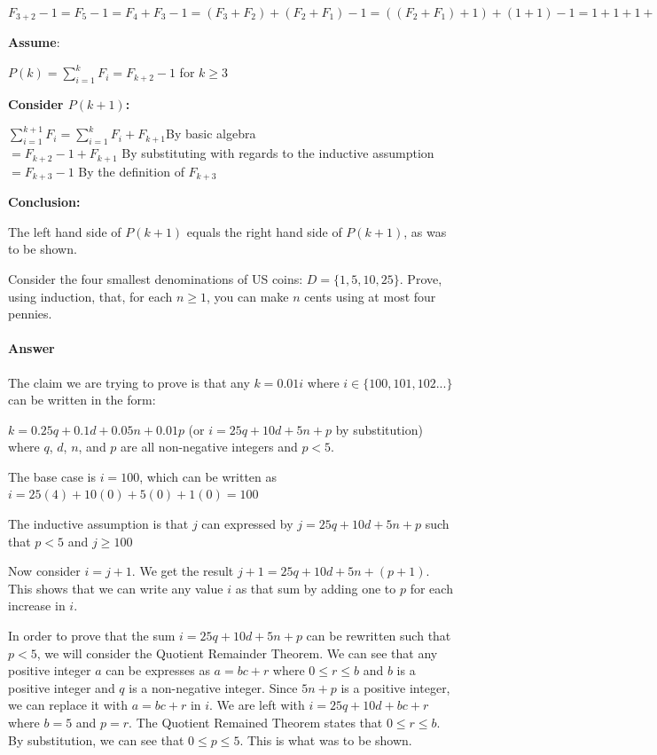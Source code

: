 \documentclass{article}
\begin{document}
$F_{3+2}-1 = F_5 - 1 = F_4 + F_3 - 1 = (F_3 + F_2) +(F_2 + F_1) - 1 = ((F_2 + F_1) + 1) + (1 + 1) - 1 =1 + 1 + 1 + 1 + 1 -1 = 4$

\textbf{Assume}:

$P(k) = \sum_{i=1}^k F_i = F_{k+2}-1$ for $k \geq 3$ 

\textbf{Consider $P(k+1)$:}

$\sum_{i=1}^{k+1} F_i = \sum_{i=1}^k F_i + F_{k+1}$\quad By basic algebra \\
$= F_{k+2}-1 + F_{k+1}$ \quad By substituting with regards to the inductive assumption \\
$= F_{k+3} - 1$ \quad By the definition of $F_{k+3}$

\textbf{Conclusion:}

The left hand side of $P(k+1)$ equals the right hand side of $P(k+1)$, as was to be shown.



 

Consider the four smallest denominations of US coins: $D=\{1,5,10,25\}$.  Prove, using
induction, that, for each $n \geq 1$, you can make $n$ cents using at most four
pennies.

\paragraph{Answer}
The claim we are trying to prove is that any $k = 0.01i$ where $i \in \{100, 101, 102...\}$ can be written in the form:

$k = 0.25q + 0.1d + 0.05n + 0.01p$ (or $i = 25q + 10d + 5n + p$ by substitution)
where $q$, $d$, $n$, and $p$ are all non-negative integers and $p<5$.

The base case is $i = 100$, which can be written as $i = 25(4) + 10(0) + 5(0) + 1(0) = 100$

The inductive assumption is that $j$ can expressed by $j = 25q + 10d + 5n + p$ such that $p<5$ and $j \geq 100$

Now consider $i=j+1$. We get the result $j+1 = 25q + 10d +5n + (p+1)$. This shows that we can write any value 
$i$ as that sum by adding one to $p$ for each increase in $i$.

In order to prove that the sum $i = 25q + 10d + 5n + p$ can be rewritten such that $p<5$, we will consider the Quotient Remainder Theorem.
We can see that any positive integer $a$ can be expresses as $a = bc + r$ where $0 \leq r \leq b$ and $b$ is a positive integer and $q$ is a non-negative integer.
Since $5n+p$ is a positive integer, we can replace it with $a=bc+r$ in $i$. We are left with  $i = 25q + 10d + bc+r$ where $b=5$ and $p=r$. 
The Quotient Remained Theorem states that $0 \leq r \leq b$. By substitution, we can see that $0 \leq p \leq 5$. This is what was to be shown.
\end{document}
